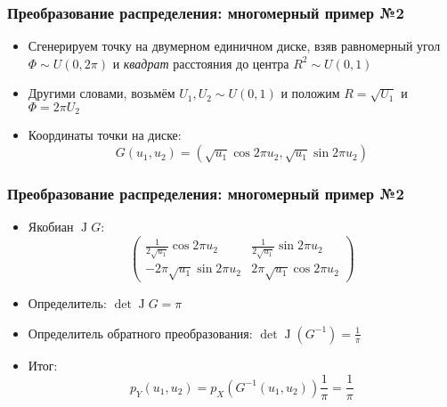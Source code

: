 \documentclass[handout,10pt]{beamer}
\begin{document}
\begin{frame}[fragile]
\frametitle{Преобразование распределения: многомерный пример №2}
\begin{itemize}
\item Сгенерируем точку на двумерном единичном диске, взяв равномерный угол \begin{math}\Phi\sim U(0,2\pi)\end{math} и \textit{квадрат} расстояния до центра \begin{math}R^2\sim U(0,1)\end{math}
\pause
\item Другими словами, возьмём \begin{math}U_1, U_2 \sim U(0,1)\end{math} и положим \begin{math}R = \sqrt{U_1}\end{math} и \begin{math}\Phi = 2\pi U_2\end{math} 
\pause
\item Координаты точки на диске: \begin{equation*}G(u_1, u_2) = (\sqrt{u_1}\cos 2\pi u_2, \sqrt{u_1}\sin 2\pi u_2)\end{equation*}
\end{itemize}
\end{frame}

\begin{frame}[fragile]
\frametitle{Преобразование распределения: многомерный пример №2}
\begin{itemize}
\item Якобиан \begin{math}\operatorname J G\end{math}:
\begin{equation*}
\begin{pmatrix}
\frac{1}{2\sqrt{u_1}}\cos 2\pi u_2 & \frac{1}{2\sqrt{u_1}}\sin 2\pi u_2 \\
-2\pi\sqrt{u_1}\sin 2\pi u_2 & 2\pi\sqrt{u_1}\cos 2\pi u_2
\end{pmatrix}
\end{equation*}
\pause
\item Определитель: \begin{math}\det \operatorname J G = \pi\end{math}
\pause
\item Определитель обратного преобразования: \begin{math}\det \operatorname J(G^{-1}) = \frac{1}{\pi}\end{math}
\pause
\item Итог: \begin{equation*}p_Y(u_1, u_2) = p_X(G^{-1}(u_1, u_2)) \frac{1}{\pi} = \frac{1}{\pi}\end{equation*}
\end{itemize}
\end{frame}
\end{document}
